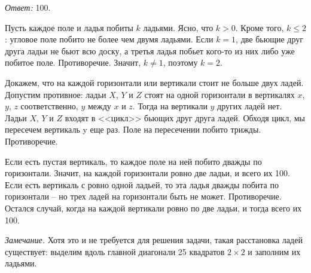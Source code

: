 \ifincludesolutions
\emph{Ответ:} 100.
\par
Пусть каждое поле и ладья побиты $k$ ладьями.
Ясно, что $k > 0$.
Кроме того, $k \leq 2$: угловое поле побито не более чем двумя ладьями.
Если $k = 1$, две бьющие друг друга ладьи не бьют всю доску, а третья ладья
побьет кого-то из них либо уже побитое поле.
Противоречие.
Значит, $k \neq 1$, поэтому $k = 2$.
\par
Докажем, что на каждой горизонтали или вертикали стоит не больше двух ладей.
Допустим противное: ладьи $X$, $Y$ и $Z$ стоят на одной горизонтали
в вертикалях $x$, $y$, $z$ соответственно, $y$ между $x$ и $z$.
Тогда на вертикали $y$ других ладей нет.
Ладьи $X$, $Y$ и $Z$ входят в <<цикл>> бьющих друг друга ладей.
Обходя цикл, мы пересечем вертикаль y еще раз.
Поле на пересечении побито трижды.
Противоречие.
\par
Если есть пустая вертикаль, то каждое поле на ней побито дважды по горизонтали.
Значит, на каждой горизонтали ровно две ладьи, и всего их 100.
Если есть вертикаль с ровно одной ладьей, то эта ладья дважды побита по горизонтали – но трех ладей на горизонтали быть не может. Противоречие.
Остался случай, когда на каждой вертикали ровно по две ладьи, и тогда всего
их 100.
\par
\emph{Замечание.}
Хотя это и не требуется для решения задачи, такая расстановка ладей существует:
выделим вдоль главной диагонали 25 квадратов $2 \times 2$ и заполним
их ладьями.
\fi %

\endgroup %

